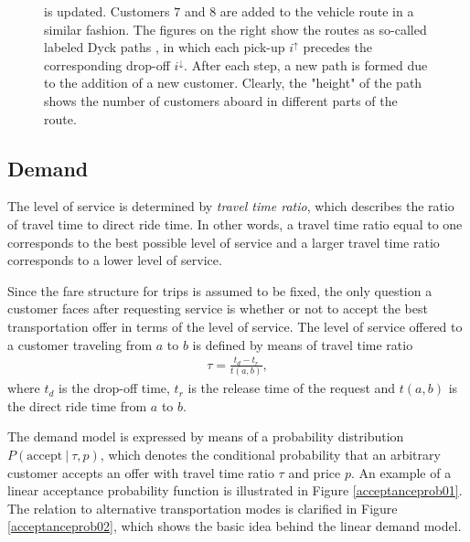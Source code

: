 \documentclass[dissertation,draft*]{aaltoseries}
\begin{document}
\begin{figure}
\begin{center}
{is updated. Customers $7$ and $8$ are added to the vehicle route in a similar fashion.
The figures on the right show the routes as so-called labeled Dyck 
paths \citep{cori, eadarp},
in which each pick-up $i^{\uparrow}$ precedes the corresponding drop-off $i^{\downarrow}$. 
After each step, a new path is formed due to the addition of a new customer. Clearly, the "height" of the path
shows the number of customers aboard in different parts of the route.
}
\label{dynamicexample07}
\end{center}
\end{figure}

\subsection{Demand}
The level of service is determined by \emph{travel time ratio}, which describes the ratio of travel time to direct ride time.
In other words, a travel time ratio equal to one corresponds to the best possible level of service and 
a larger travel time ratio corresponds to a lower level of service. 

Since the fare structure for trips is assumed to be fixed, 
the only question a customer faces after requesting service is whether or not to accept the best transportation offer in terms
of the level of service. 
The level of service offered to a customer traveling from $a$ to $b$ is defined by means of travel time ratio
\begin{align}
\tau=\frac{t_d-t_r}{t(a,b)},
\end{align}
where $t_d$ is the drop-off time, $t_r$ is the release time of the request and $t(a,b)$ is the direct ride time from $a$ to $b$. 

The demand model is expressed by means of a probability distribution $P(\mbox{accept} \ | \ \tau,p)$, 
which denotes the conditional probability that an arbitrary customer accepts an offer with travel time ratio $\tau$ and price $p$. 
An example of a linear acceptance probability function is illustrated in Figure \ref{acceptanceprob01}. The relation 
to alternative transportation modes is clarified in Figure \ref{acceptanceprob02}, which shows the basic idea behind the linear demand model.
\end{document}

